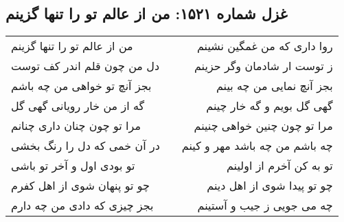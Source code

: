 \begin{center}
\section*{غزل شماره ۱۵۲۱: من از عالم تو را تنها گزینم}
\label{sec:1521}
\begin{longtable}{l p{0.5cm} r}
من از عالم تو را تنها گزینم
&&
روا داری که من غمگین نشینم
\\
دل من چون قلم اندر کف توست
&&
ز توست ار شادمان وگر حزینم
\\
بجز آنچ تو خواهی من چه باشم
&&
بجز آنچ نمایی من چه بینم
\\
گه از من خار رویانی گهی گل
&&
گهی گل بویم و گه خار چینم
\\
مرا تو چون چنان داری چنانم
&&
مرا تو چون چنین خواهی چنینم
\\
در آن خمی که دل را رنگ بخشی
&&
چه باشم من چه باشد مهر و کینم
\\
تو بودی اول و آخر تو باشی
&&
تو به کن آخرم از اولینم
\\
چو تو پنهان شوی از اهل کفرم
&&
چو تو پیدا شوی از اهل دینم
\\
بجز چیزی که دادی من چه دارم
&&
چه می جویی ز جیب و آستینم
\\
\end{longtable}
\end{center}
